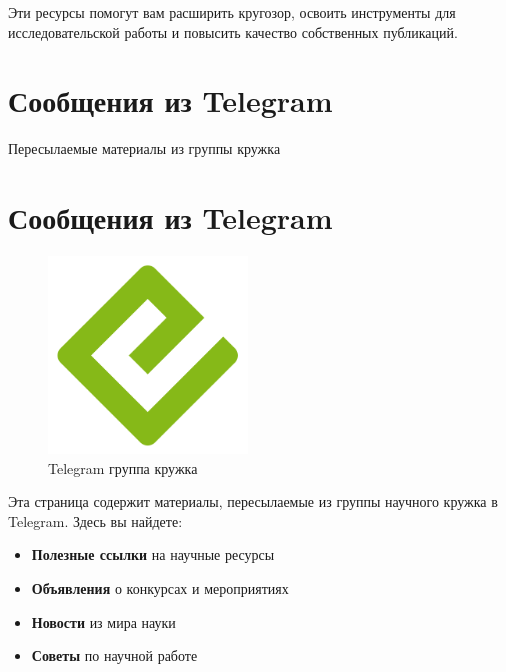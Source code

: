 \documentclass[
  russian,
  12pt,
  a4paper,
]{article}
\providecommand{\tightlist}{%
  \setlength{\itemsep}{0pt}\setlength{\parskip}{0pt}}
\begin{document}
Эти ресурсы помогут вам расширить кругозор, освоить инструменты для
исследовательской работы и повысить качество собственных публикаций.


\chapter{Сообщения из
Telegram}\label{ux441ux43eux43eux431ux449ux435ux43dux438ux44f-ux438ux437-telegram}

Пересылаемые материалы из группы кружка

\hfill\break


\chapter{Сообщения из Telegram}\label{sec-telegram}

\begin{figure}[H]

{\centering \includegraphics[width=2.08333in,height=\textheight,keepaspectratio]{cover.png}

}

\caption{Telegram группа кружка}

\end{figure}%

Эта страница содержит материалы, пересылаемые из группы научного кружка
в Telegram. Здесь вы найдете:

\begin{itemize}
\tightlist
\item
  \textbf{Полезные ссылки} на научные ресурсы
\item
  \textbf{Объявления} о конкурсах и мероприятиях
\item
  \textbf{Новости} из мира науки
\item
  \textbf{Советы} по научной работе
\end{itemize}
\end{document}
